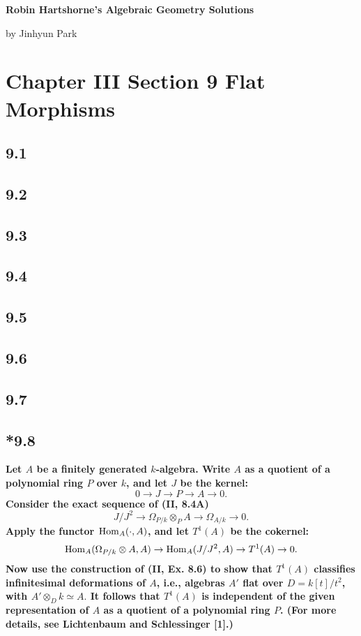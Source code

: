\documentclass[11pt]{amsart}          %
\renewcommand{\hom}{{\rm Hom}}
\begin{document}
\begin{center}
\bf
\large Robin Hartshorne's Algebraic Geometry Solutions
\end{center}
\begin{center}
by Jinhyun Park
\end{center}
\vskip0.5cm

\section*{Chapter III Section 9 Flat Morphisms}

\subsection*{9.1}
\subsection*{9.2}
\subsection*{9.3}
\subsection*{9.4}
\subsection*{9.5}
\subsection*{9.6}
\subsection*{9.7}
\subsection*{*9.8}\textbf{Let $A$ be a finitely generated $k$-algebra. Write $A$ as a quotient of a polynomial ring $P$ over $k$, and let $J$ be the kernel:
$$0 \to J \to P \to A \to 0.$$
Consider the exact sequence of (II, 8.4A)
$$J/J^2 \to \Omega_{P/k} \otimes_P A \to \Omega_{A/k} \to 0.$$
Apply the functor $\hom_A (\cdot, A)$, and let $T^1 (A)$ be the cokernel:
$$\hom_A (\Omega_{P/k} \otimes A, A) \to \hom_A (J/J^2, A) \to T^1 (A) \to 0.$$
Now use the construction of (II, Ex. 8.6) to show that $T^1 (A)$ classifies infinitesimal deformations of $A$, i.e., algebras $A'$ flat over $D = k[t]/t^2$, with $A' \otimes_D k \simeq A.$ It follows that $T^1 (A)$ is independent of the given representation of $A$ as a quotient of a polynomial ring $P$. (For more details, see Lichtenbaum and Schlessinger [1].)
}
\end{document}
